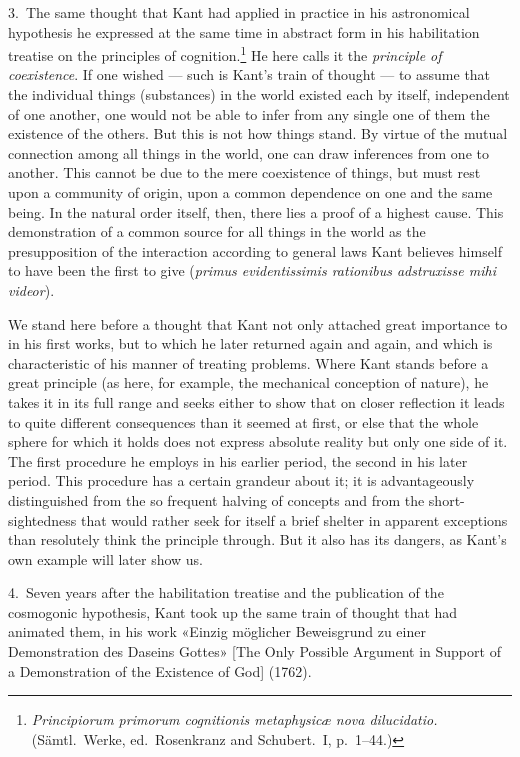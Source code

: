 \documentclass[12pt,a4paper]{article}
\newcommand{\opage}[1]{\marginnote{\footnotesize\textit{[#1]}}}
\begin{document}
3.\ The same thought that Kant had applied in practice in his astronomical
hypothesis he expressed at the same time in abstract form in his
habilitation treatise on the principles of
cognition.\footnote{\textit{Principiorum primorum cognitionis metaphysicæ
nova dilucidatio.} (Sämtl.\ Werke, ed.\ Rosenkranz and Schubert.\ I, p.\
1--44.)} He here calls it the \emph{principle of coexistence}. If one wished ---
such is Kant's train of thought --- to assume that the individual things
(substances) in the world existed each by itself, independent of one
another, one would not be able to infer from any single one of them the
existence of the others. But this is not how things stand. By virtue of
the mutual \opage{11}connection among all things in the world, one can draw
inferences from one to another. This cannot be due to the mere coexistence
of things, but must rest upon a community of origin, upon a common
dependence on one and the same being. In the natural order itself, then,
there lies a proof of a highest cause. This demonstration of a common
source for all things in the world as the presupposition of the
interaction according to general laws Kant believes himself to have been
the first to give (\textit{primus evidentissimis rationibus adstruxisse
mihi videor}).

We stand here before a thought that Kant not only attached great
importance to in his first works, but to which he later returned again and
again, and which is characteristic of his manner of treating problems.
Where Kant stands before a great principle (as here, for example, the
mechanical conception of nature), he takes it in its full range and seeks
either to show that on closer reflection it leads to quite different
consequences than it seemed at first, or else that the whole sphere for
which it holds does not express absolute reality but only one side of it.
The first procedure he employs in his earlier period, the second in his
later period. This procedure has a certain grandeur about it; it is
advantageously distinguished from the so frequent halving of concepts and
from the short-sightedness that would rather seek for itself a brief
shelter in apparent exceptions than resolutely think the principle
through. But it also has its dangers, as Kant's own example will later
show us.

4.\ Seven years after the habilitation treatise and the publication of the
cosmogonic hypothesis, Kant took up the same train of thought that had
animated them, in his work «Einzig möglicher Beweisgrund zu einer
Demonstration des Daseins Gottes» [The Only Possible Argument in Support
of a Demonstration of the Existence of God] (1762).
\end{document}

